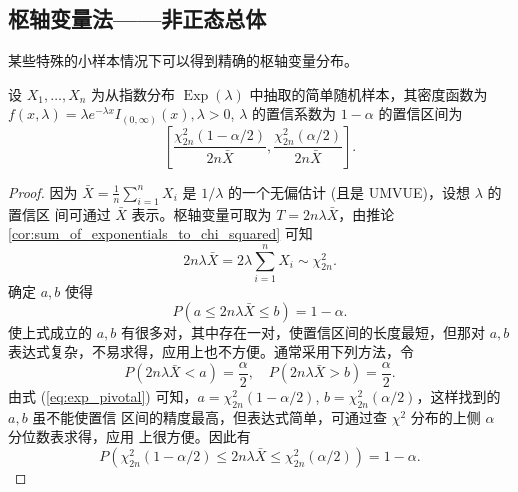 \subsection{枢轴变量法——非正态总体}\label{subsec:枢轴变量法——非正态总体}
某些特殊的小样本情况下可以得到精确的枢轴变量分布。
\begin{proposition}[指数分布参数的置信区间]\label{prop:指数分布参数的置信区间}
设 $X_1, \dots, X_n$ 为从指数分布 $\operatorname{Exp}(\lambda)$ 中抽取的简单随机样本，其密度函数为
$f(x, \lambda) = \lambda e^{-\lambda x}I_{(0, \infty)}(x), \lambda > 0$, $\lambda$ 的置信系数为 $1-\alpha$ 的置信区间为
\begin{equation}
\left[\frac{\chi_{2n}^2(1-\alpha/2)}{2n\bar{X}}, \frac{\chi_{2n}^2(\alpha/2)}{2n\bar{X}}\right]. \label{eq:exp_lambda_ci}
\end{equation}
\end{proposition}
\begin{proof}
    因为 $\bar{X} = \frac{1}{n}\sum_{i=1}^n X_i$ 是 $1/\lambda$ 的一个无偏估计 (且是 UMVUE)，设想 $\lambda$ 的置信区
间可通过 $\bar{X}$ 表示。枢轴变量可取为 $T = 2n\lambda\bar{X}$，由推论 \ref{cor:sum_of_exponentials_to_chi_squared} 可知
\begin{equation}
2n\lambda\bar{X} = 2\lambda \sum_{i=1}^n X_i \sim \chi_{2n}^2.\label{eq:exp_pivotal}
\end{equation}
确定 $a, b$ 使得
$$P(a \le 2n\lambda\bar{X} \le b) = 1-\alpha.$$
使上式成立的 $a, b$ 有很多对，其中存在一对，使置信区间的长度最短，但那对 $a, b$
表达式复杂，不易求得，应用上也不方便。通常采用下列方法，令
$$P(2n\lambda\bar{X} < a) = \frac{\alpha}{2}, \quad P(2n\lambda\bar{X} > b) = \frac{\alpha}{2}.$$
由式 (\ref{eq:exp_pivotal}) 可知，$a = \chi_{2n}^2(1-\alpha/2)$, $b = \chi_{2n}^2(\alpha/2)$，这样找到的 $a, b$ 虽不能使置信
区间的精度最高，但表达式简单，可通过查 $\chi^2$ 分布的上侧 $\alpha$ 分位数表求得，应用
上很方便。因此有
$$P\left(\chi_{2n}^2(1-\alpha/2) \le 2n\lambda\bar{X} \le \chi_{2n}^2(\alpha/2)\right) = 1-\alpha.$$
\end{proof}

